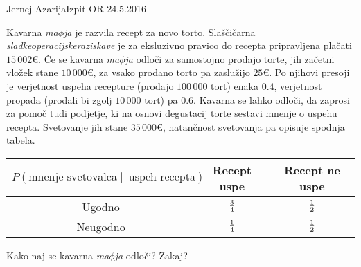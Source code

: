 \begin{naloga}{Jernej Azarija}{Izpit OR 24.5.2016}
\begin{vprasanje}
Kavarna {\em ma$\phi$ja} je razvila recept za novo torto.
Slaščičarna {\em sladkeoperacijskeraziskave}
je za eksluzivno pravico do recepta pripravljena plačati $15\,002 €$.
Če se kavarna {\em ma$\phi$ja} odloči za samostojno prodajo torte,
jih začetni vložek stane $10\,000 €$,
za vsako prodano torto pa zaslužijo $25 €$.
Po njihovi presoji
je verjetnost uspeha recepture (prodajo $100\,000$ tort) enaka $0.4$,
verjetnost propada (prodali bi zgolj $10\,000$ tort) pa $0.6$.
Kavarna se lahko odloči, da zaprosi za pomoč tudi pod\-jet\-je,
ki na osnovi degustacij torte sestavi mnenje o uspehu recepta.
Svetovanje jih stane $35\,000 €$,
natančnost svetovanja pa opisuje spodnja tabela.
\begin{center}
\begin{tabular}{c|cc}
$P(\text{mnenje svetovalca} \;|\;\ \text{uspeh recepta})$
& Recept uspe & Recept ne uspe \\ \hline
Ugodno   & ${3 \over 4}$ & ${1 \over 2}$ \\
Neugodno & ${1 \over 4}$ & ${1 \over 2}$
\end{tabular}
\end{center}
Kako naj se kavarna {\em ma$\phi$ja} odloči?
Zakaj?
\end{vprasanje}
\begin{odgovor}
\end{odgovor}
\end{naloga}
